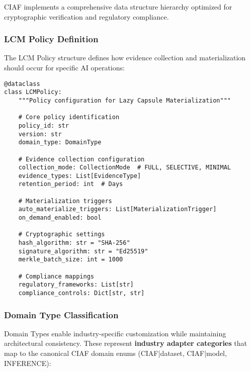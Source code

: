 \documentclass[12pt,a4paper]{article}
\begin{document}
CIAF implements a comprehensive data structure hierarchy optimized for cryptographic verification and regulatory compliance.

\subsubsection{LCM Policy Definition}

The LCM Policy structure defines how evidence collection and materialization should occur for specific AI operations:

\begin{lstlisting}[caption=LCM Policy Data Structure]
@dataclass
class LCMPolicy:
    """Policy configuration for Lazy Capsule Materialization"""
    
    # Core policy identification
    policy_id: str
    version: str
    domain_type: DomainType
    
    # Evidence collection configuration
    collection_mode: CollectionMode  # FULL, SELECTIVE, MINIMAL
    evidence_types: List[EvidenceType]
    retention_period: int  # Days
    
    # Materialization triggers
    auto_materialize_triggers: List[MaterializationTrigger]
    on_demand_enabled: bool
    
    # Cryptographic settings
    hash_algorithm: str = "SHA-256"
    signature_algorithm: str = "Ed25519"
    merkle_batch_size: int = 1000
    
    # Compliance mappings
    regulatory_frameworks: List[str]
    compliance_controls: Dict[str, str]
\end{lstlisting}

\subsubsection{Domain Type Classification}

Domain Types enable industry-specific customization while maintaining architectural consistency. These represent \textbf{industry adapter categories} that map to the canonical CIAF domain enums (CIAF|dataset, CIAF|model, INFERENCE):
\end{document}
